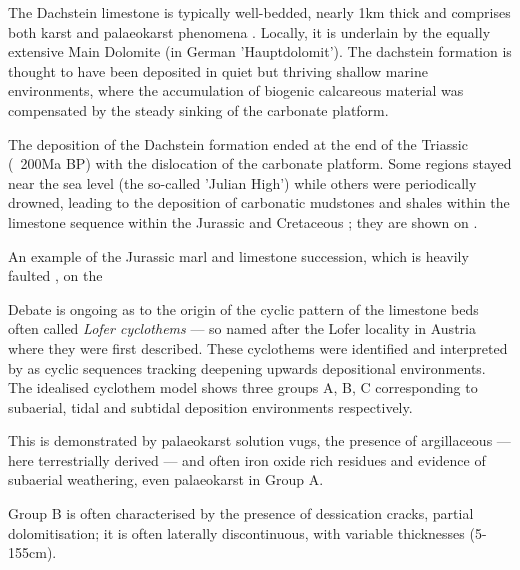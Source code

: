 The Dachstein limestone is typically well-bedded, nearly 1km thick and comprises both karst and palaeokarst phenomena \citep{ogorelec1996dachstein,haas2007characteristics}. Locally, it is underlain by the equally extensive Main Dolomite (in German 'Hauptdolomit'). The dachstein formation is thought to have been deposited in quiet but thriving shallow marine environments, where the accumulation of biogenic calcareous material was compensated by the steady sinking of the carbonate platform. 

The deposition of the Dachstein formation ended at the end of the Triassic (~200Ma BP) with the dislocation of the carbonate platform. Some regions stayed near the sea level (the so-called 'Julian High') while others were periodically drowned, leading to the deposition of carbonatic mudstones and shales within the limestone sequence within the Jurassic and Cretaceous \citep{vsmuc2010jurassic}; they are shown on .





\begin{marginfigure}
\checkoddpage \ifoddpage \forcerectofloat \else \forceversofloat \fi
\centering
 \caption{An example of the Jurassic marl and limestone succession, which is heavily faulted , on the \protect{}}
 \label{fig:limestones and marls}
\end{marginfigure}

Debate is ongoing as to the origin of the cyclic pattern of the limestone beds often called \emph{Lofer cyclothems} --- so named after the Lofer locality in Austria where they were first described. 
These cyclothems were identified and interpreted by \citet{fisher1964lofer} as cyclic sequences tracking deepening upwards depositional environments.
The idealised cyclothem model shows three groups A, B, C corresponding to  subaerial, tidal and subtidal deposition environments respectively.  

This is demonstrated by palaeokarst solution vugs, the presence of argillaceous --- here terrestrially derived --- and often iron oxide rich residues and evidence of subaerial weathering, even palaeokarst in Group A.

Group B is often characterised by the presence of dessication cracks, partial dolomitisation; it is often laterally discontinuous, with variable thicknesses (5-155cm).

